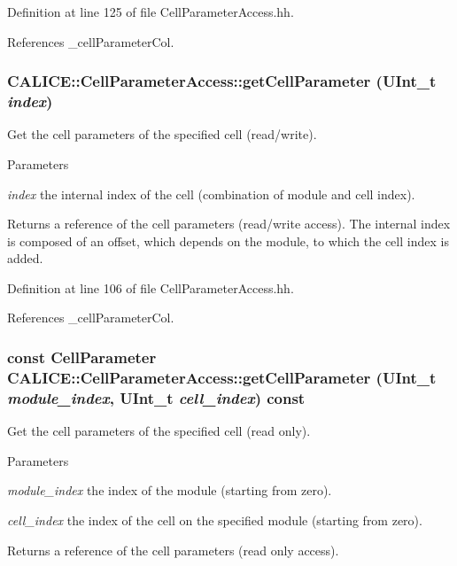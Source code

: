 Definition at line 125 of file CellParameterAccess.hh.

References \_\-cellParameterCol.
\subsubsection[{getCellParameter}]{ CALICE::CellParameterAccess::getCellParameter (UInt\_\-t {\em index})\hspace{0.3cm}{\ttfamily  [inline]}}\label{classCALICE_1_1CellParameterAccess_a7df752eebf34fb87ff5be595fbbc1095}


Get the cell parameters of the specified cell (read/write). 
\begin{DoxyParams}{Parameters}
\item[{\em index}]the internal index of the cell (combination of module and cell index). \end{DoxyParams}
\begin{DoxyReturn}{Returns}
a reference of the cell parameters (read/write access). The internal index is composed of an offset, which depends on the module, to which the cell index is added. 
\end{DoxyReturn}


Definition at line 106 of file CellParameterAccess.hh.

References \_\-cellParameterCol.
\subsubsection[{getCellParameter}]{\setlength{\rightskip}{0pt plus 5cm}const {\bf CellParameter} CALICE::CellParameterAccess::getCellParameter (UInt\_\-t {\em module\_\-index}, \/  UInt\_\-t {\em cell\_\-index}) const\hspace{0.3cm}{\ttfamily  [inline]}}\label{classCALICE_1_1CellParameterAccess_a519a471698646bf0ae9b59fbd80e7d1f}


Get the cell parameters of the specified cell (read only). 
\begin{DoxyParams}{Parameters}
\item[{\em module\_\-index}]the index of the module (starting from zero). \item[{\em cell\_\-index}]the index of the cell on the specified module (starting from zero). \end{DoxyParams}
\begin{DoxyReturn}{Returns}
a reference of the cell parameters (read only access). 
\end{DoxyReturn}


